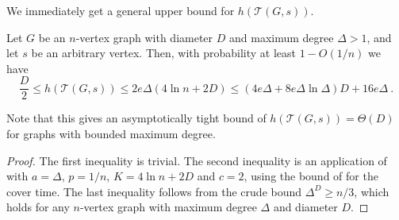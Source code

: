 \documentclass{patmorin}
\newcommand{\tcal}{\mathcal{T}}
\begin{document}
We immediately get a general upper bound for $h(\tcal(G,s))$.

\begin{thm}
  Let $G$ be an $n$-vertex graph with diameter $D$ and maximum degree $\Delta>1$, and let $s$ be an arbitrary vertex.
Then, with probability at least $1-O(1/n)$ we have
\[
\frac D 2 \leq h(\tcal(G,s)) \leq 2e\Delta (4\ln n+2 D) \leq 
(4 e \Delta + 8 e\Delta  \ln \Delta )D + 16 e\Delta  \:.
\]
\end{thm}

Note that this gives an asymptotically tight bound of $h(\tcal(G,s))=\Theta(D)$ for graphs with bounded maximum degree.

\begin{proof}
The first inequality is trivial.
The second inequality is an application of  with $a=\Delta$, $p=1/n$,
  $K=4\ln n+2D$ and $c=2$, using the bound of  for the cover time.
The last inequality follows from the crude bound $\Delta^D \geq n/3$, which holds for any $n$-vertex graph with maximum degree $\Delta$ and diameter $D$.
\end{proof}

%
\end{document}
